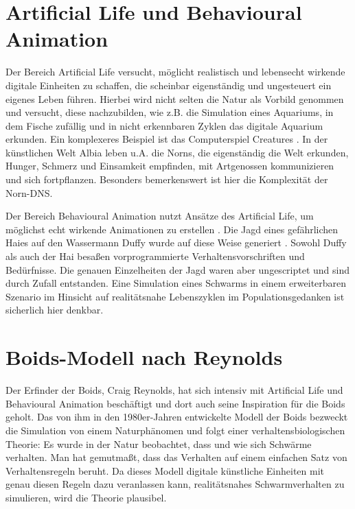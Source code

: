 \documentclass[draft=false
              ,paper=a4
              ,twoside=false
              ,fontsize=11pt
              ,headsepline
              ,BCOR10mm
              ,DIV11
              ,bibtotoc
              ,liststotoc
              ]{scrbook}
\begin{document}
\section{Artificial Life und Behavioural Animation}
Der Bereich Artificial Life versucht, möglicht realistisch und lebensecht wirkende digitale Einheiten zu schaffen, die scheinbar eigenständig und ungesteuert ein eigenes Leben führen. Hierbei wird nicht selten die Natur als Vorbild genommen und versucht, diese nachzubilden, wie z.B. die Simulation eines Aquariums, in dem Fische zufällig und in nicht erkennbaren Zyklen das digitale Aquarium erkunden. Ein komplexeres Beispiel ist das Computerspiel Creatures \cite{norns}. In der künstlichen Welt Albia leben u.A. die Norns, die eigenständig die Welt erkunden, Hunger, Schmerz und Einsamkeit empfinden, mit Artgenossen kommunizieren und sich fortpflanzen. Besonders bemerkenswert ist hier die Komplexität der Norn-DNS.

Der Bereich Behavioural Animation nutzt Ansätze des Artificial Life, um möglichst echt wirkende Animationen zu erstellen \cite{reynolds87}. Die Jagd eines gefährlichen Haies auf den Wassermann Duffy wurde auf diese Weise generiert \cite{Funge:1999:CMK:311535.311538}. Sowohl Duffy als auch der Hai besaßen vorprogrammierte Verhaltensvorschriften und Bedürfnisse. Die genauen Einzelheiten der Jagd waren aber ungescriptet und sind durch Zufall entstanden.
Eine Simulation eines Schwarms in einem erweiterbaren Szenario im Hinsicht auf realitätsnahe Lebenszyklen im Populationsgedanken ist sicherlich hier denkbar.
\section{Boids-Modell nach Reynolds}
Der Erfinder der Boids, Craig Reynolds, hat sich intensiv mit Artificial Life und Behavioural Animation beschäftigt und dort auch seine Inspiration für die Boids geholt.
Das von ihm in den 1980er-Jahren entwickelte Modell der Boids \cite{reynolds87}\cite{oai:CiteSeerPSU:509294}\cite{Reynolds:1988:NBI} bezweckt die Simulation von einem Naturphänomen und folgt einer verhaltensbiologischen Theorie: Es wurde in der Natur beobachtet, dass und wie sich Schwärme verhalten. Man hat gemutmaßt, dass das Verhalten auf einem einfachen Satz von Verhaltensregeln beruht. Da dieses Modell digitale künstliche Einheiten mit genau diesen Regeln dazu veranlassen kann, realitätsnahes Schwarmverhalten zu simulieren, wird die Theorie plausibel.
\end{document}
